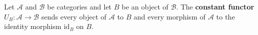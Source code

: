 Let $\mathcal{A}$ and $\mathcal{B}$ be categories and let $B$ be an object of $\mathcal{B}$. The \textbf{constant functor} $U_B: \mathcal{A} \to \mathcal{B}$ sends every object of $\mathcal{A}$ to $B$ and every morphism of $\mathcal{A}$ to the identity morphism $\mathrm{id}_B$ on $B$.
